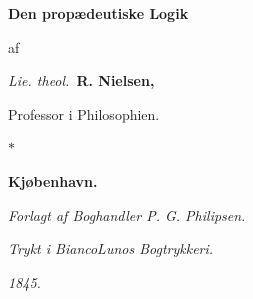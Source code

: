 \documentclass[12pt]{book}
\begin{document}

\frontmatter

\begin{titlepage}
\centering
\vspace*{3.0cm}
{\Huge\bfseries Den propædeutiske Logik\par}
\vspace{1.6cm}
{\small af\par}
\vspace{0.7cm}
{\large\textit{Lie. theol.}\ {\LARGE\bfseries R. Nielsen,}\par}
\vspace{0.4cm}
{\large Professor i Philosophien.\par}
\vspace{1.8cm}
{\Large $\ast$\par}          %
\vspace{1.8cm}
{\Large\bfseries Kjøbenhavn.\par}
\vspace{0.6cm}
{\emph{Forlagt af Boghandler P. G. Philipsen.}\par}
\vspace{0.35cm}
{\small\emph{Trykt i BiancoLunos Bogtrykkeri.}\par}
\vspace{1.2cm}
{\large\textit{1845.}\par}
\end{titlepage}

\end{document}
